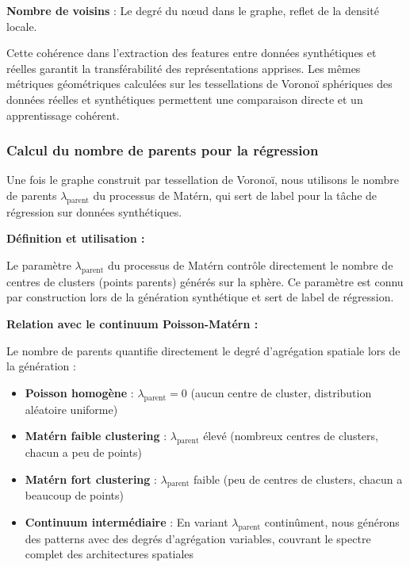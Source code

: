 \textbf{Nombre de voisins} : Le degré du nœud dans le graphe, reflet de la densité locale.

Cette cohérence dans l'extraction des features entre données synthétiques et réelles garantit la transférabilité des représentations apprises. Les mêmes métriques géométriques calculées sur les tessellations de Voronoï sphériques des données réelles et synthétiques permettent une comparaison directe et un apprentissage cohérent.

\subsubsection{Calcul du nombre de parents pour la régression}

Une fois le graphe construit par tessellation de Voronoï, nous utilisons le nombre de parents $\lambda_{\text{parent}}$ du processus de Matérn, qui sert de label pour la tâche de régression sur données synthétiques.

\textbf{Définition et utilisation :}

Le paramètre $\lambda_{\text{parent}}$ du processus de Matérn contrôle directement le nombre de centres de clusters (points parents) générés sur la sphère. Ce paramètre est connu par construction lors de la génération synthétique et sert de label de régression.

\textbf{Relation avec le continuum Poisson-Matérn :}

Le nombre de parents quantifie directement le degré d'agrégation spatiale lors de la génération :

\begin{itemize}
    \item \textbf{Poisson homogène} : $\lambda_{\text{parent}} = 0$ (aucun centre de cluster, distribution aléatoire uniforme)
    
    \item \textbf{Matérn faible clustering} : $\lambda_{\text{parent}}$ élevé (nombreux centres de clusters, chacun a peu de points)
    
    \item \textbf{Matérn fort clustering} : $\lambda_{\text{parent}}$ faible (peu de centres de clusters, chacun a beaucoup de points)
    
    \item \textbf{Continuum intermédiaire} : En variant $\lambda_{\text{parent}}$ continûment, nous générons des patterns avec des degrés d'agrégation variables, couvrant le spectre complet des architectures spatiales
\end{itemize}

